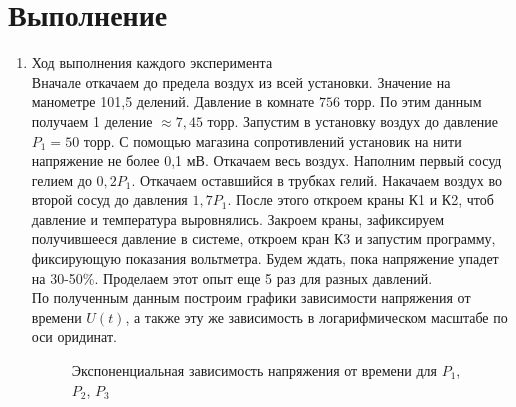 \documentclass[a4paper]{article}
\begin{document}
\section{Выполнение}
\begin{enumerate}

\item Ход выполнения каждого эксперимента\\
Вначале откачаем до предела воздух из всей установки. Значение на манометре 101,5 делений.  Давление в комнате $756$ торр. По этим данным получаем 1 деление $\approx 7,45$ торр. Запустим в установку воздух до давление $P_1 = 50$ торр. С помощью магазина сопротивлений установик на нити напряжение не более 0,1 мВ. Откачаем весь воздух. Наполним первый сосуд гелием до $0,2P_1$. Откачаем оставшийся в трубках гелий. Накачаем воздух во второй сосуд до давления $1,7P_1$. После этого откроем краны К1 и К2, чтоб давление и температура выровнялись. Закроем краны, зафиксируем получившееся давление в системе, откроем кран К3 и запустим программу, фиксирующую показания вольтметра. Будем ждать, пока напряжение упадет на 30-50\%. Проделаем этот опыт еще 5 раз для разных давлений.\\ 
По полученным данным построим графики зависимости напряжения от времени $U(t)$, а также эту же зависимость в логарифмическом масштабе по оси оридинат.
\clearpage
\begin{figure}[h!]
\caption[]{\label{} Экспоненциальная зависимость напряжения от времени для $P_1$, $P_2$, $P_3$}
\end{figure}
\begin{figure}[h!]

\end{figure}
\end{enumerate}
\end{document}
